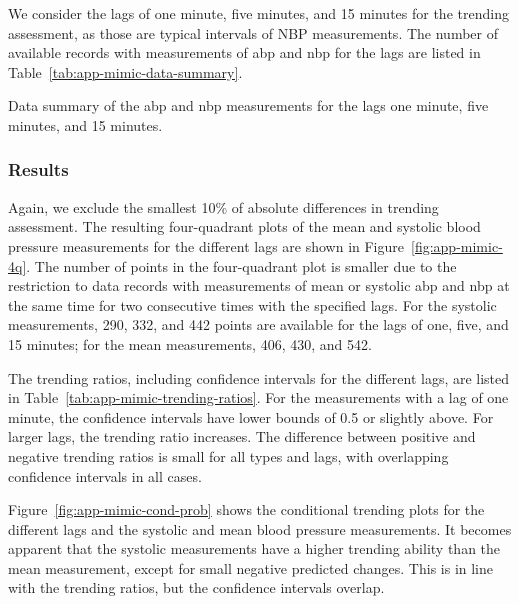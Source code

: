 We consider the lags of one minute, five minutes, and 15 minutes for the trending assessment, as those are typical intervals of NBP measurements.
The number of available records with measurements of \ac{abp} and \ac{nbp} for the lags are listed in Table~\ref{tab:app-mimic-data-summary}.

\begin{table}
    \centering
%    
    \caption{Data summary of the \ac{abp} and \ac{nbp} measurements for the lags one minute, five minutes, and 15 minutes.}
    \label{tab:app-mimic-data-summary}
\end{table}

\subsubsection*{Results}

Again, we exclude the smallest 10\% of absolute differences in trending assessment.
The resulting four-quadrant plots of the mean and systolic blood pressure measurements for the different lags are shown in Figure~\ref{fig:app-mimic-4q}.
The number of points in the four-quadrant plot is smaller due to the restriction to data records with measurements of mean or systolic \ac{abp} and \ac{nbp} at the same time for two consecutive times with the specified lags.
For the systolic measurements, 290, 332, and 442 points are available for the lags of one, five, and 15 minutes; for the mean measurements, 406, 430, and 542.

The trending ratios, including confidence intervals for the different lags, are listed in Table~\ref{tab:app-mimic-trending-ratios}.
For the measurements with a lag of one minute, the confidence intervals have lower bounds of 0.5 or slightly above.
For larger lags, the trending ratio increases.
The difference between positive and negative trending ratios is small for all types and lags, with overlapping confidence intervals in all cases.

Figure~\ref{fig:app-mimic-cond-prob} shows the conditional trending plots for the different lags and the systolic and mean blood pressure measurements.
It becomes apparent that the systolic measurements have a higher trending ability than the mean measurement, except for small negative predicted changes.
This is in line with the trending ratios, but the confidence intervals overlap.

